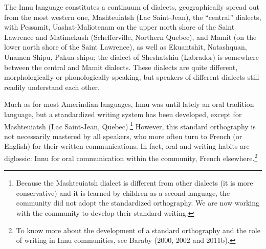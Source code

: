 \documentclass[letterpaper]{article}
\begin{document}
The Innu language constitutes a continuum of dialects, geographically spread out from the most western one, Mashteuiatsh (Lac Saint-Jean), the {\textquotedblleft}central{\textquotedblright} dialects, with Pessamit, Uashat-Maliotenam on the upper north shore of the Saint Lawrence and Matimekush (Schefferville, Northern Quebec), and Mamit (on the lower north shore of the Saint Lawrence), as well as Ekuantshit, Natashquan, Unamen-Shipu, Pakua-shipu; the dialect of Sheshatshiu (Labrador) is somewhere between the central and Mamit dialects. These dialects are quite different, morphologically or phonologically speaking, but speakers of different dialects still readily understand each other. 

Much as for most Amerindian languages, Innu was until lately an oral tradition language, but a standardized writing system has been developed, except for Mashteuiatsh (Lac Saint-Jean, Quebec).\footnote{ Because the Mashteuiatsh dialect is different from other dialects (it is more conservative) and it is learned by children as a second language, the community did not adopt the standardized orthography. We are now working with the community to develop their standard writing.} However, this standard orthography is not necessarily mastered by all speakers, who more often turn to French (or English) for their written communications. In fact, oral and writing habits are diglossic: Innu for oral communication within the community, French elsewhere.\footnote{ To know more about the development of a standard orthography and the role of writing in Innu communities, see Baraby (2000, 2002 and 2011b).}
\end{document}
